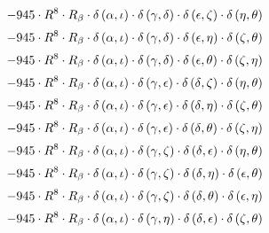 \begin{subequations}
\begin{gather}
 \\[0.2em] \notag 		 - 945 \cdot R^{8} \cdot R_{\beta{}} \cdot \delta{}\left(\alpha{}, \iota{}\right) \cdot \delta{}\left(\gamma{}, \delta{}\right) \cdot \delta{}\left(\epsilon{}, \zeta{}\right) \cdot \delta{}\left(\eta{}, \theta{}\right) 
 \\[0.2em] \notag 		 - 945 \cdot R^{8} \cdot R_{\beta{}} \cdot \delta{}\left(\alpha{}, \iota{}\right) \cdot \delta{}\left(\gamma{}, \delta{}\right) \cdot \delta{}\left(\epsilon{}, \eta{}\right) \cdot \delta{}\left(\zeta{}, \theta{}\right) 
 \\[0.2em] \notag 		 - 945 \cdot R^{8} \cdot R_{\beta{}} \cdot \delta{}\left(\alpha{}, \iota{}\right) \cdot \delta{}\left(\gamma{}, \delta{}\right) \cdot \delta{}\left(\epsilon{}, \theta{}\right) \cdot \delta{}\left(\zeta{}, \eta{}\right) 
 \\[0.2em] \notag 		 - 945 \cdot R^{8} \cdot R_{\beta{}} \cdot \delta{}\left(\alpha{}, \iota{}\right) \cdot \delta{}\left(\gamma{}, \epsilon{}\right) \cdot \delta{}\left(\delta{}, \zeta{}\right) \cdot \delta{}\left(\eta{}, \theta{}\right) 
 \\[0.2em] \notag 		 - 945 \cdot R^{8} \cdot R_{\beta{}} \cdot \delta{}\left(\alpha{}, \iota{}\right) \cdot \delta{}\left(\gamma{}, \epsilon{}\right) \cdot \delta{}\left(\delta{}, \eta{}\right) \cdot \delta{}\left(\zeta{}, \theta{}\right) 
 \\[0.2em] \notag 		 - 945 \cdot R^{8} \cdot R_{\beta{}} \cdot \delta{}\left(\alpha{}, \iota{}\right) \cdot \delta{}\left(\gamma{}, \epsilon{}\right) \cdot \delta{}\left(\delta{}, \theta{}\right) \cdot \delta{}\left(\zeta{}, \eta{}\right) 
 \\[0.2em] \notag 		 - 945 \cdot R^{8} \cdot R_{\beta{}} \cdot \delta{}\left(\alpha{}, \iota{}\right) \cdot \delta{}\left(\gamma{}, \zeta{}\right) \cdot \delta{}\left(\delta{}, \epsilon{}\right) \cdot \delta{}\left(\eta{}, \theta{}\right) 
 \\[0.2em] \notag 		 - 945 \cdot R^{8} \cdot R_{\beta{}} \cdot \delta{}\left(\alpha{}, \iota{}\right) \cdot \delta{}\left(\gamma{}, \zeta{}\right) \cdot \delta{}\left(\delta{}, \eta{}\right) \cdot \delta{}\left(\epsilon{}, \theta{}\right) 
 \\[0.2em] \notag 		 - 945 \cdot R^{8} \cdot R_{\beta{}} \cdot \delta{}\left(\alpha{}, \iota{}\right) \cdot \delta{}\left(\gamma{}, \zeta{}\right) \cdot \delta{}\left(\delta{}, \theta{}\right) \cdot \delta{}\left(\epsilon{}, \eta{}\right) 
 \\[0.2em] \notag 		 - 945 \cdot R^{8} \cdot R_{\beta{}} \cdot \delta{}\left(\alpha{}, \iota{}\right) \cdot \delta{}\left(\gamma{}, \eta{}\right) \cdot \delta{}\left(\delta{}, \epsilon{}\right) \cdot \delta{}\left(\zeta{}, \theta{}\right) 

\end{gather}
\end{subequations}
